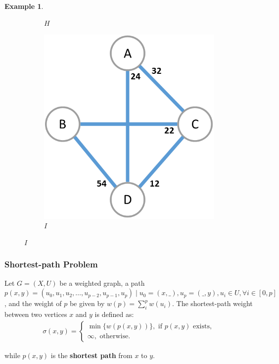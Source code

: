 \documentclass[12pt]{report}
\newtheorem{example}{Example}[section]
\begin{document}
\begin{example}
\begin{figure}[H]
\begin{subfigure}{.33\linewidth}
			\caption{$H$}
			\label{fig:example-graph-nn}
		\end{subfigure}%
		\begin{subfigure}{.33\linewidth}
			\centering
			\includegraphics[width=.8\linewidth]{graphs/example-graph-en}
			\caption{$I$}
			\label{fig:example-graph-en}
		\end{subfigure}
	\end{figure}
\end{example}

\subsubsection{Shortest-path Problem \cite{cor2011}}

Let $G=(X, U)$ be a weighted graph, a path $p(x, y)=(u_0, u_1, u_2, \dots, u_{p-2}, u_{p-1}, u_{p}) \mid u_0 = (x, \_), u_p = (\_, y), u_i \in U, \forall i \in [0, p]$, and the weight of $p$ be given by $w(p) = \sum_i^p w(u_i)$. The shortest-path weight between two vertices $x$ and $y$ is defined as:
\begin{align*}
	\sigma(x, y) = \begin{cases}
		\min \{w(p(x, y))\}, \text{ if $p(x, y)$ exists}, \\
		\infty, \text{ otherwise.}
	\end{cases}
\end{align*}

while $p(x, y)$ is the \textbf{shortest path} from $x$ to $y$.
\end{document}
